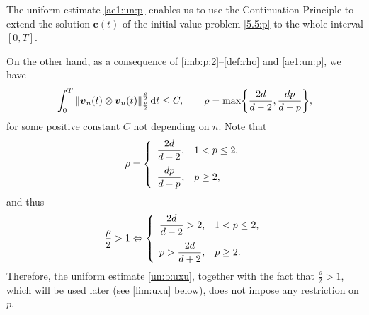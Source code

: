 \documentclass[12pt,reqno]{amsart}
\numberwithin{equation}{section}
\let\originalleft\left
\let\originalright\right
\renewcommand{\left}{\mathopen{}\mathclose\bgroup\originalleft}
\renewcommand{\right}{\aftergroup\egroup\originalright}
\theoremstyle{definition}
\def\dt{\,\mathrm{d}t}
\def\vv{\boldsymbol{v}}
\def\bfc{\mathbf{c}}
\begin{document}
The uniform estimate \eqref{ae1:un:p} enables us to use the Continuation Principle to extend the solution $\bfc(t)$ of the initial-value problem \eqref{5.5:p} to the whole interval $[0,T]$.

On the other hand, as a consequence of \eqref{imb:p:2}--\eqref{def:rho} and \eqref{ae1:un:p}, we have
\begin{equation}\label{un:b:uxu}
\int_0^T\|\vv_n(t)\otimes\vv_n(t)\|_{\frac{\rho}{2}}^{\frac{\rho}{2}}\dt\leq C, \qquad \rho=\max\left\{\frac{2d}{d-2},\frac{dp}{d-p}\right\},
\end{equation}
for some positive constant $C$ not depending on $n$.
Note that
\begin{equation*}
\rho=\left\{
\begin{array}{ll}
\displaystyle \frac{2d}{d-2}, & 1<p\leq 2, \\[10pt]
\displaystyle \frac{dp}{d-p}, & p\geq 2,
\end{array}
\right.
\end{equation*}
and thus
\begin{equation*}
\frac{\rho}{2}>1\Leftrightarrow
\left\{
\begin{array}{ll}
\displaystyle \frac{2d}{d-2}>2, & 1<p\leq 2, \\[10pt]
\displaystyle p>\frac{2d}{d+2}, & p\geq 2.
\end{array}
\right.
\end{equation*}
Therefore, the uniform estimate \eqref{un:b:uxu}, together with the fact that $\frac{\rho}{2}>1$, which will be used later (see \eqref{lim:uxu} below), does not impose any restriction on $p$.
\end{document}

